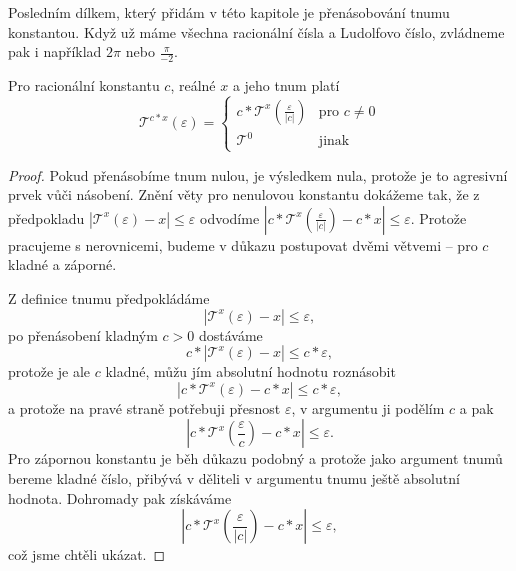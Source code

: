 Posledním dílkem, který přidám v této kapitole je přenásobování tnumu konstantou. Když už máme všechna racionální čísla a Ludolfovo číslo, zvládneme pak i například $2\pi$ nebo $\frac{\pi}{-2}$.

\begin{theorem}
Pro racionální konstantu $c$, reálné $x$ a jeho tnum platí 
\begin{equation}
\mathcal{T}^{c*x}(\varepsilon)=\begin{cases}c*\mathcal{T}^{x}\left(\frac{\varepsilon}{|c|}\right) & \text{pro~}c\not = 0\\\mathcal{T}^0&\text{jinak}\end{cases}
\end{equation}
\begin{proof}
Pokud přenásobíme tnum nulou, je výsledkem nula, protože je to agresivní prvek vůči násobení. Znění věty pro nenulovou konstantu dokážeme tak, že z předpokladu $|\mathcal{T}^{x}(\varepsilon)-x|\leq\varepsilon$ odvodíme $|c*\mathcal{T}^{x}(\frac{\varepsilon}{|c|})-c*x|\leq\varepsilon$. Protože pracujeme s nerovnicemi, budeme v důkazu postupovat dvěmi větvemi -- pro $c$ kladné a záporné.

Z definice tnumu předpokládáme
\begin{equation}
|\mathcal{T}^{x}(\varepsilon)-x|\leq\varepsilon,
\end{equation}
po přenásobení kladným $c>0$ dostáváme
\begin{equation}
c*|\mathcal{T}^{x}(\varepsilon)-x|\leq c*\varepsilon,
\end{equation}
protože je ale $c$ kladné, můžu jím absolutní hodnotu roznásobit
\begin{equation}
|c*\mathcal{T}^{x}(\varepsilon)-c*x|\leq c*\varepsilon,
\end{equation}
a protože na pravé straně potřebuji přesnost $\varepsilon$, v argumentu ji podělím $c$ a pak
\begin{equation}
\left|c*\mathcal{T}^{x}\left(\frac{\varepsilon}{c}\right)-c*x\right|\leq \varepsilon.
\end{equation}
Pro zápornou konstantu je běh důkazu podobný a protože jako argument tnumů bereme kladné číslo, přibývá v děliteli v argumentu tnumu ještě absolutní hodnota. Dohromady pak získáváme
\begin{equation}
\left|c*\mathcal{T}^{x}\left(\frac{\varepsilon}{|c|}\right)-c*x\right|\leq\varepsilon,
\end{equation}
což jsme chtěli ukázat.
\end{proof}
\end{theorem}

